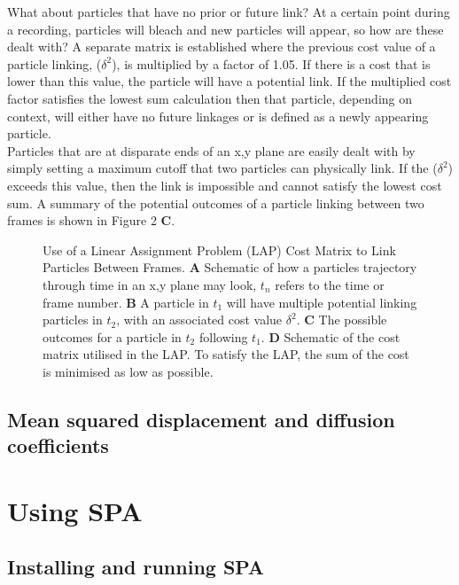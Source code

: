 \documentclass[11pt]{article} %
\begin{document}
What about particles that have no prior or future link? At a certain point during a recording, particles will bleach and new particles will appear, so how are these dealt with? A separate matrix is established where the previous cost value of a particle linking, ($\delta^2$), is multiplied by a factor of 1.05. If there is a cost that is lower than this value, the particle will have a potential link. If the multiplied cost factor satisfies the lowest sum calculation then that particle, depending on context, will either have no future linkages or is defined as a newly appearing particle. \\

Particles that are at disparate ends of an x,y plane are easily dealt with by simply setting a maximum cutoff that two particles can physically link. If the ($\delta^2$) exceeds this value, then the link is impossible and cannot satisfy the lowest cost sum. A summary of the potential outcomes of a particle linking between two frames is shown in Figure 2 \textbf{C}.

	\begin{figure}
	\caption{Use of a Linear Assignment Problem (LAP) Cost Matrix to Link Particles Between Frames. \textbf{A} Schematic of how a particles trajectory through 		time in an x,y plane may look, $t_n$ refers to the time or frame number. \textbf{B} A particle in $t_1$ will have multiple potential linking particles in $t_2$, 			with an associated cost value $\delta^2$. \textbf{C} The possible outcomes for a particle in $t_2$ following $t_1$. \textbf{D} Schematic of the cost matrix 			utilised in the LAP. To satisfy the LAP, the sum of the cost is minimised as low as possible.}
	\end{figure}

\subsection{Mean squared displacement and diffusion coefficients}

\section{Using SPA}

\subsection{Installing and running SPA}
\end{document}
